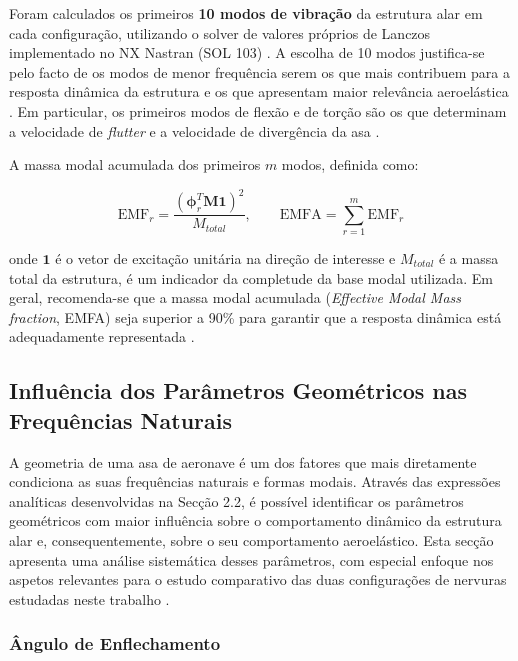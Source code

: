 \documentclass[a4paper,fleqn]{cas-sc}
\begin{document}
Foram calculados os primeiros \textbf{10 modos de vibração} da estrutura alar em cada configuração, utilizando o solver de valores próprios de Lanczos implementado no NX Nastran (SOL 103) \cite{Nastran2014}. A escolha de 10 modos justifica-se pelo facto de os modos de menor frequência serem os que mais contribuem para a resposta dinâmica da estrutura e os que apresentam maior relevância aeroelástica \cite{Craig2006}. Em particular, os primeiros modos de flexão e de torção são os que determinam a velocidade de \textit{flutter} e a velocidade de divergência da asa \cite{Bisplinghoff1996, Fung1993}.

A massa modal acumulada dos primeiros $m$ modos, definida como:

\begin{equation}
    \text{EMF}_r = \frac{\left( \boldsymbol{\phi}_r^T \mathbf{M} 
    \mathbf{1} \right)^2}{M_{total}}, \qquad 
    \text{EMFA} = \sum_{r=1}^{m} \text{EMF}_r
    \label{eq:emf}
\end{equation}

\noindent onde $\mathbf{1}$ é o vetor de excitação unitária na direção de interesse e $M_{total}$ é a massa total da estrutura, é um indicador da completude da base modal utilizada. Em geral, recomenda-se que a massa modal acumulada (\textit{Effective Modal Mass fraction}, EMFA) seja superior a 90\% para garantir que a resposta dinâmica está adequadamente representada \cite{Craig2006, Nastran2014}.

\subsection{Influência dos Parâmetros Geométricos nas Frequências Naturais}

A geometria de uma asa de aeronave é um dos fatores que mais diretamente condiciona as suas frequências naturais e formas modais. Através das expressões analíticas desenvolvidas na Secção 2.2, é possível identificar os parâmetros geométricos com maior influência sobre o comportamento dinâmico da estrutura alar e, consequentemente, sobre o seu comportamento aeroelástico. Esta secção apresenta uma análise sistemática desses parâmetros, com especial enfoque nos aspetos relevantes para o estudo comparativo das duas configurações de nervuras estudadas neste trabalho \cite{Bisplinghoff1996, Wright2015}.

\subsubsection{Ângulo de Enflechamento}
\end{document}
